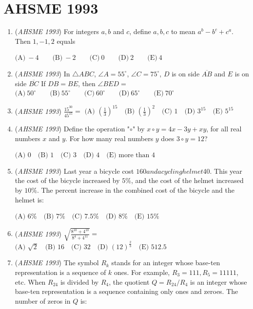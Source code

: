 \section{AHSME 1993}
        \begin{enumerate}
        	\item (\textit{AHSME 1993}) For integers $a, b$ and $c$, define $\boxed{a,b,c}$ to mean $a^b-b^c+c^a$. Then $\boxed{1,-1,2}$ equals


 $\text{(A)} \ -4 \qquad \text{(B)} \ -2 \qquad \text{(C)} \ 0 \qquad \text{(D)} \ 2 \qquad \text{(E)} \ 4$


	\item (\textit{AHSME 1993}) In $\triangle ABC$, $\angle A=55^\circ$, $\angle C=75^\circ$, $D$ is on side $\overline{AB}$ and $E$ is on side $\overline{BC}$ If $DB=BE$, then $\angle BED=$
$\text{(A)}\ 50^\circ \qquad \text{(B)}\ 55^\circ \qquad \text{(C)}\ 60^\circ \qquad \text{(D)}\ 65^\circ \qquad \text{(E)}\ 70^\circ$


	\item (\textit{AHSME 1993}) $\frac{15^{30}}{45^{15}} =$
$\text{(A) } \left(\frac{1}{3}\right)^{15}\quad \text{(B) } \left(\frac{1}{3}\right)^{2}\quad \text{(C) } 1\quad \text{(D) } 3^{15}\quad \text{(E) } 5^{15}$


	\item (\textit{AHSME 1993}) Define the operation "$\circ$" by $x\circ y=4x-3y+xy$, for all real numbers $x$ and $y$. For how many real numbers $y$ does $3\circ y=12$?


 $\text{(A) } 0\quad \text{(B) } 1\quad \text{(C) } 3\quad \text{(D) } 4\quad \text{(E) more than 4}$


	\item (\textit{AHSME 1993}) Last year a bicycle cost $160 and a cycling helmet $40. This year the cost of the bicycle increased by $5\%$, and the cost of the helmet increased by $10\%$. The percent increase in the combined cost of the bicycle and the helmet is:


 $\text{(A) } 6\%\quad \text{(B) } 7\%\quad \text{(C) } 7.5\%\quad \text{(D) } 8\%\quad \text{(E) } 15\%$


	\item (\textit{AHSME 1993}) $\sqrt{\frac{8^{10}+4^{10}}{8^4+4^{11}}}=$
$\text{(A) } \sqrt{2}\quad \text{(B) } 16\quad \text{(C) } 32\quad \text{(D) } (12)^{\frac{2}{3}}\quad \text{(E) } 512.5$


	\item (\textit{AHSME 1993}) The symbol $R_k$ stands for an integer whose base-ten representation is a sequence of $k$ ones. For example, $R_3=111,R_5=11111$, etc. When $R_{24}$ is divided by $R_4$, the quotient $Q=R_{24}/R_4$ is an integer whose base-ten representation is a sequence containing only ones and zeroes. The number of zeros in $Q$ is:



\end{enumerate}
